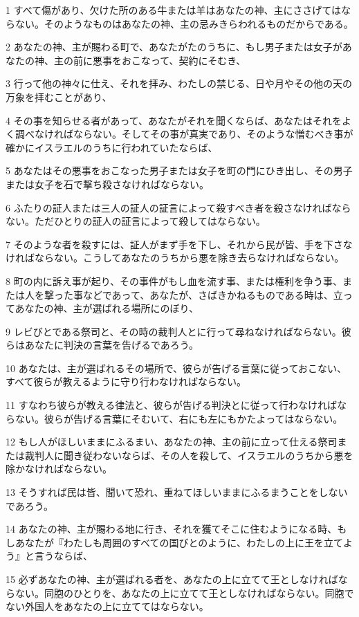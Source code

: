 \par 1 すべて傷があり、欠けた所のある牛または羊はあなたの神、主にささげてはならない。そのようなものはあなたの神、主の忌みきらわれるものだからである。
\par 2 あなたの神、主が賜わる町で、あなたがたのうちに、もし男子または女子があなたの神、主の前に悪事をおこなって、契約にそむき、
\par 3 行って他の神々に仕え、それを拝み、わたしの禁じる、日や月やその他の天の万象を拝むことがあり、
\par 4 その事を知らせる者があって、あなたがそれを聞くならば、あなたはそれをよく調べなければならない。そしてその事が真実であり、そのような憎むべき事が確かにイスラエルのうちに行われていたならば、
\par 5 あなたはその悪事をおこなった男子または女子を町の門にひき出し、その男子または女子を石で撃ち殺さなければならない。
\par 6 ふたりの証人または三人の証人の証言によって殺すべき者を殺さなければならない。ただひとりの証人の証言によって殺してはならない。
\par 7 そのような者を殺すには、証人がまず手を下し、それから民が皆、手を下さなければならない。こうしてあなたのうちから悪を除き去らなければならない。
\par 8 町の内に訴え事が起り、その事件がもし血を流す事、または権利を争う事、または人を撃った事などであって、あなたが、さばきかねるものである時は、立ってあなたの神、主が選ばれる場所にのぼり、
\par 9 レビびとである祭司と、その時の裁判人とに行って尋ねなければならない。彼らはあなたに判決の言葉を告げるであろう。
\par 10 あなたは、主が選ばれるその場所で、彼らが告げる言葉に従っておこない、すべて彼らが教えるように守り行わなければならない。
\par 11 すなわち彼らが教える律法と、彼らが告げる判決とに従って行わなければならない。彼らが告げる言葉にそむいて、右にも左にもかたよってはならない。
\par 12 もし人がほしいままにふるまい、あなたの神、主の前に立って仕える祭司または裁判人に聞き従わないならば、その人を殺して、イスラエルのうちから悪を除かなければならない。
\par 13 そうすれば民は皆、聞いて恐れ、重ねてほしいままにふるまうことをしないであろう。
\par 14 あなたの神、主が賜わる地に行き、それを獲てそこに住むようになる時、もしあなたが『わたしも周囲のすべての国びとのように、わたしの上に王を立てよう』と言うならば、
\par 15 必ずあなたの神、主が選ばれる者を、あなたの上に立てて王としなければならない。同胞のひとりを、あなたの上に立てて王としなければならない。同胞でない外国人をあなたの上に立ててはならない。
